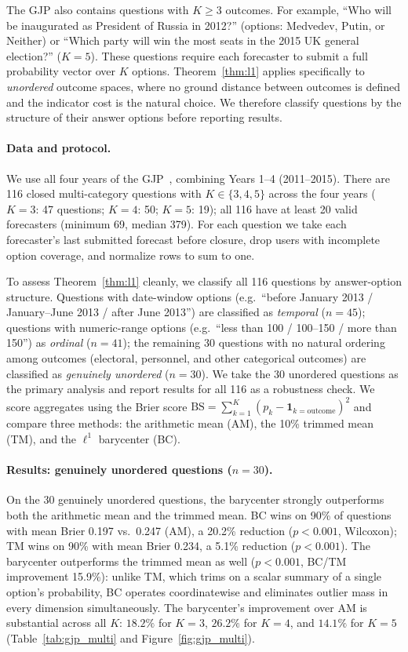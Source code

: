 The GJP also contains questions with $K \geq 3$ outcomes. For example, ``Who will be inaugurated as President of Russia in 2012?'' (options: Medvedev, Putin, or Neither) or ``Which party will win the most seats in the 2015 UK general election?'' ($K=5$).  These questions require each forecaster to submit a full probability vector over $K$ options.  Theorem~\ref{thm:l1} applies specifically to \emph{unordered} outcome spaces, where no ground distance between outcomes is defined and the indicator cost is the natural choice.  We therefore classify questions by the structure of their answer options before reporting results.

\paragraph{Data and protocol.}  We use all four years of the GJP~\cite{tetlock_dataverse}, combining Years 1--4 (2011--2015).  There are 116 closed multi-category questions with $K\in\{3,4,5\}$ across the four years ($K=3$: 47 questions; $K=4$: 50; $K=5$: 19); all 116 have at least 20 valid forecasters (minimum 69, median 379).  For each question we take each forecaster's last submitted forecast before closure, drop users with incomplete option coverage, and normalize rows to sum to one.

To assess Theorem~\ref{thm:l1} cleanly, we classify all 116 questions by answer-option structure.  Questions with date-window options (e.g.\ ``before January 2013 / January--June 2013 / after June 2013'') are classified as \emph{temporal} ($n=45$); questions with numeric-range options (e.g.\ ``less than 100 / 100--150 / more than 150'') as \emph{ordinal} ($n=41$); the remaining 30 questions with no natural ordering among outcomes (electoral, personnel, and other categorical outcomes) are classified as \emph{genuinely unordered} ($n=30$).  We take the 30 unordered questions as the primary analysis and report results for all 116 as a robustness check.  We score aggregates using the Brier score $\mathrm{BS} = \sum_{k=1}^K (p_k - \mathbf{1}_{k=\text{outcome}})^2$ and compare three methods: the arithmetic mean (AM), the 10\% trimmed mean (TM), and the $\ell^1$ barycenter (BC).

\paragraph{Results: genuinely unordered questions ($n=30$).}  On the 30 genuinely unordered questions, the barycenter strongly outperforms both the arithmetic mean and the trimmed mean.  BC wins on 90\% of questions with mean Brier 0.197 vs.\ 0.247 (AM), a 20.2\% reduction ($p < 0.001$, Wilcoxon); TM wins on 90\% with mean Brier 0.234, a 5.1\% reduction ($p < 0.001$).  The barycenter outperforms the trimmed mean as well ($p < 0.001$, BC/TM improvement 15.9\%): unlike TM, which trims on a scalar summary of a single option's probability, BC operates coordinatewise and eliminates outlier mass in every dimension simultaneously.  The barycenter's improvement over AM is substantial across all $K$: $18.2\%$ for $K=3$, $26.2\%$ for $K=4$, and $14.1\%$ for $K=5$ (Table~\ref{tab:gjp_multi} and Figure~\ref{fig:gjp_multi}).

